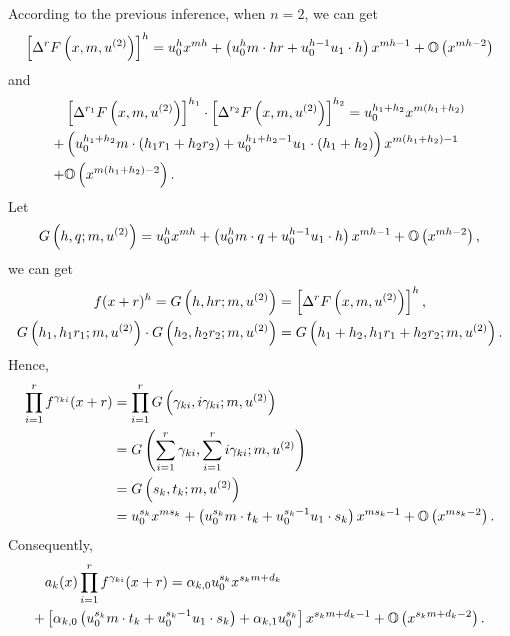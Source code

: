According to the previous inference, when $n=2$, we can get
\begin{equation}
\left[\Delta^r F\left(x,m,u^{(2)}\right)\right]^h=u_0^h x^{mh}+\left(u_0^hm\cdot hr+u_0^{h-1}u_1\cdot h\right)x^{mh-1}+\mathbb O\left(x^{mh-2}\right)
\end{equation}
and
\begin{equation}
\begin{split}
&\left[\Delta^{r_1}F\left(x,m,u^{(2)}\right)\right]^{h_1}\cdot \left[\Delta^{r_2}F\left(x,m,u^{(2)}\right)\right]^{h_2}=u_0^{h_1+h_2} x^{m(h_1+h_2)} \\
+&\left(u_0^{h_1+h_2}m\cdot (h_1r_1+h_2r_2)+u_0^{h_1+h_2-1}u_1\cdot (h_1+h_2)\right)x^{m(h_1+h_2)-1} \\
+&\mathbb O\left(x^{m(h_1+h_2)-2}\right).
\end{split}
\end{equation}
Let
\begin{equation}
G\left(h,q;m,u^{(2)}\right)=u_0^h x^{mh}+\left(u_0^hm\cdot q+u_0^{h-1}u_1\cdot h\right)x^{mh-1}+\mathbb O\left(x^{mh-2}\right),
\end{equation}
we can get
\begin{equation}
\begin{split}
f(x+r)^h=G\left(h,hr;m,u^{(2)}\right)&=\left[\Delta^r F\left(x,m,u^{(2)}\right)\right]^h, \\
G\left(h_1,h_1r_1;m,u^{(2)}\right)\cdot G\left(h_2,h_2r_2;m,u^{(2)}\right)&=G\left(h_1+h_2,h_1r_1+h_2r_2;m,u^{(2)}\right).
\end{split}
\label{key}
\end{equation}
Hence,
\begin{equation}
\begin{split}
\prod_{i=1}^r{f^{\gamma_{ki}}(x+r)}&=\prod_{i=1}^r{G\left(\gamma_{ki},i\gamma_{ki};m,u^{(2)}\right)} \\
&=G\left(\sum_{i=1}^r{\gamma_{ki}},\sum_{i=1}^r{i\gamma_{ki}};m,u^{(2)}\right) \\
&=G\left(s_k,t_k;m,u^{(2)}\right) \\
&=u_0^{s_k} x^{m{s_k}}+\left(u_0^{s_k}m\cdot {t_k}+u_0^{{s_k}-1}u_1\cdot {s_k}\right)x^{m{s_k}-1}+\mathbb O\left(x^{m{s_k}-2}\right) .
\end{split}
\end{equation}
Consequently,
\begin{equation}
\begin{split}
& a_k(x)\prod_{i=1}^r{f^{\gamma_{ki}}(x+r)} = \alpha_{k,0}u_0^{s_k} x^{{s_k}m+d_k} \\
+& \left[\alpha_{k,0}\left(u_0^{s_k}m\cdot {t_k}+u_0^{{s_k}-1}u_1\cdot {s_k}\right)+\alpha_{k,1}u_0^{s_k}\right]x^{{s_k}m+d_k-1}+\mathbb O\left(x^{{s_k}m+d_k-2}\right) .
\end{split}
\end{equation}
